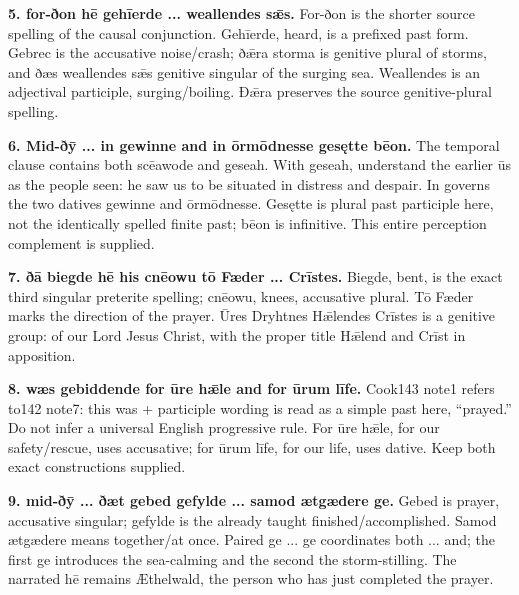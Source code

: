 \textbf{5. for-ðon hē gehīerde ... weallendes sǣs.} For-ðon is the shorter source spelling of the causal conjunction. Gehīerde, heard, is a prefixed past form. Gebrec is the accusative noise/\allowbreak{}crash; ðǣra storma is genitive plural of storms, and ðæs weallendes sǣs genitive singular of the surging sea. Weallendes is an adjectival participle, surging/\allowbreak{}boiling. Ðǣra preserves the source genitive-plural spelling.

\textbf{6. Mid-ðȳ ... in gewinne and in ōrmōdnesse gesętte bēon.} The temporal clause contains both scēawode and geseah. With geseah, understand the earlier ūs as the people seen: he saw us to be situated in distress and despair. In governs the two datives gewinne and ōrmōdnesse. Gesętte is plural past participle here, not the identically spelled finite past; bēon is infinitive. This entire perception complement is supplied.

\textbf{7. ðā biegde hē his cnēowu tō Fæder ... Crīstes.} Biegde, bent, is the exact third singular preterite spelling; cnēowu, knees, accusative plural. Tō Fæder marks the direction of the prayer. Ūres Dryhtnes Hǣlendes Crīstes is a genitive group: of our Lord Jesus Christ, with the proper title Hǣlend and Crīst in apposition.

\textbf{8. wæs gebiddende for ūre hǣle and for ūrum līfe.} Cook143 note1 refers to142 note7: this was + participle wording is read as a simple past here, “prayed.” Do not infer a universal English progressive rule. For ūre hǣle, for our safety/\allowbreak{}rescue, uses accusative; for ūrum līfe, for our life, uses dative. Keep both exact constructions supplied.

\textbf{9. mid-ðȳ ... ðæt gebed gefylde ... samod ætgædere ge.} Gebed is prayer, accusative singular; gefylde is the already taught finished/\allowbreak{}accomplished. Samod ætgædere means together/\allowbreak{}at once. Paired ge ... ge coordinates both ... and; the first ge introduces the sea-calming and the second the storm-stilling. The narrated hē remains Æthelwald, the person who has just completed the prayer.

